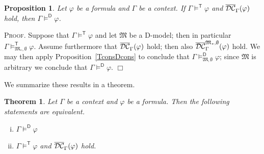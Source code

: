 \documentclass{article}
\newtheorem{theorem}[definition]{Theorem}
\newtheorem{proposition}[definition]{Proposition}
\newenvironment{proof}{\smallskip\textsc{Proof.}}{\hspace*{\fill}$\Box$}
\newcommand{\D}{\textsf D}
\newcommand{\starfun}[1]{\ensuremath{{#1}^\ast}}
\newcommand{\modelfunm}[1]{\ensuremath{\mathfrak{#1}_\ast}}
\newcommand{\modelfun}[1]{\ensuremath{{#1}_\ast}}
\newcommand{\wf}{\ \mbox{\em wf}}
\newcommand{\lang}[1]{\ensuremath{{\cal L}_{\mathsf{#1}}}}
\newcommand{\terms}[1]{\ensuremath{{\cal T}_{\mathsf{#1}}}}
\newcommand{\mymodels}[1]{\ensuremath{\models^{\mathsf{#1}}}}
\newcommand{\mymodelss}[3]{\ensuremath{\models_{\mathfrak{#2},{#3}}^{\mathsf{#1}}}}
\newcommand{\semDC}[2][{\mathfrak M},\rho]{\ensuremath{\overline{\cal{DC}}^{#1}_{#2}}}
\begin{document}
\begin{proposition}\label{TvalDval}
Let $\varphi$ be a formula and $\Gamma$ be a context.  If
$\Gamma\mymodels{T}\varphi$ and $\semDC[{}]{\Gamma}(\varphi)$ hold,
then $\Gamma\mymodels{D}\varphi$.
\end{proposition}
\begin{proof}
Suppose that $\Gamma\mymodels{T}\varphi$ and let $\mathfrak M$ be
a {\D}-model; then in particular
$\Gamma\mymodelss{T}{\modelfun M}\emptyset\varphi$.
Assume furthermore that $\semDC[{}]{\Gamma}(\varphi)$ hold; then also
$\semDC[{\modelfunm M},\emptyset]{\Gamma}(\varphi)$ hold.
We may then apply Proposition~\ref{TconsDcons} to conclude that
$\Gamma\mymodelss{D}M\emptyset\varphi$; since
$\mathfrak M$ is arbitrary we conclude that
$\Gamma\mymodels{D}\varphi$.
\end{proof}

\bigskip\noindent
We summarize these results in a theorem.
\begin{theorem}\label{TequivDsem}
Let $\Gamma$ be a context and $\varphi$ be a formula.  Then the
following statements are equivalent.
\begin{enumerate}[(i)]
\item $\Gamma\mymodels{D}\varphi$
\item $\Gamma\mymodels{T}\varphi$ and $\semDC[{}]{\Gamma}(\varphi)$ hold.
\end{enumerate}
\end{theorem}

\end{document}
